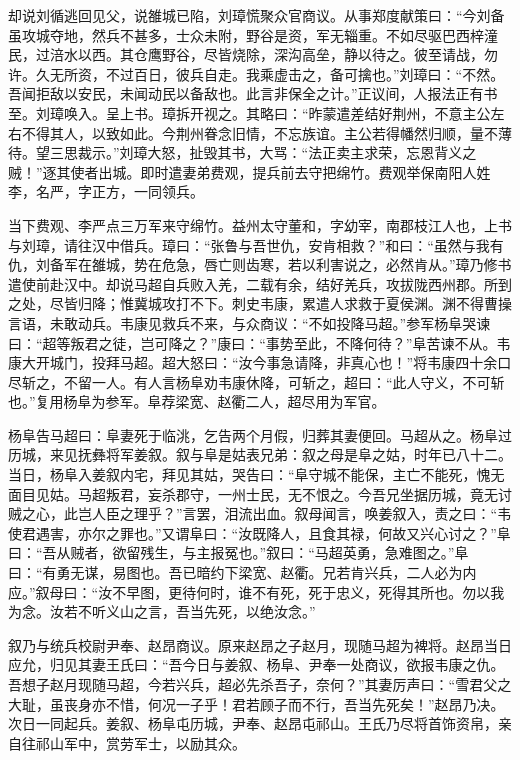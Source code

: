 却说刘循逃回见父，说雒城已陷，刘璋慌聚众官商议。从事郑度献策曰：“今刘备虽攻城夺地，然兵不甚多，士众未附，野谷是资，军无辎重。不如尽驱巴西梓潼民，过涪水以西。其仓鹰野谷，尽皆烧除，深沟高垒，静以待之。彼至请战，勿许。久无所资，不过百日，彼兵自走。我乘虚击之，备可擒也。”刘璋曰：“不然。吾闻拒敌以安民，未闻动民以备敌也。此言非保全之计。”正议间，人报法正有书至。刘璋唤入。呈上书。璋拆开视之。其略曰：“昨蒙遣差结好荆州，不意主公左右不得其人，以致如此。今荆州眷念旧情，不忘族谊。主公若得幡然归顺，量不薄待。望三思裁示。”刘璋大怒，扯毁其书，大骂：“法正卖主求荣，忘恩背义之贼！”逐其使者出城。即时遣妻弟费观，提兵前去守把绵竹。费观举保南阳人姓李，名严，字正方，一同领兵。

当下费观、李严点三万军来守绵竹。益州太守董和，字幼宰，南郡枝江人也，上书与刘璋，请往汉中借兵。璋曰：“张鲁与吾世仇，安肯相救？”和曰：“虽然与我有仇，刘备军在雒城，势在危急，唇亡则齿寒，若以利害说之，必然肯从。”璋乃修书遣使前赴汉中。却说马超自兵败入羌，二载有余，结好羌兵，攻拔陇西州郡。所到之处，尽皆归降；惟冀城攻打不下。刺史韦康，累遣人求救于夏侯渊。渊不得曹操言语，未敢动兵。韦康见救兵不来，与众商议：“不如投降马超。”参军杨阜哭谏曰：“超等叛君之徒，岂可降之？”康曰：“事势至此，不降何待？”阜苦谏不从。韦康大开城门，投拜马超。超大怒曰：“汝今事急请降，非真心也！”将韦康四十余口尽斩之，不留一人。有人言杨阜劝韦康休降，可斩之，超曰：“此人守义，不可斩也。”复用杨阜为参军。阜荐梁宽、赵衢二人，超尽用为军官。

杨阜告马超曰：阜妻死于临洮，乞告两个月假，归葬其妻便回。马超从之。杨阜过历城，来见抚彝将军姜叙。叙与阜是姑表兄弟：叙之母是阜之姑，时年已八十二。当日，杨阜入姜叙内宅，拜见其姑，哭告曰：“阜守城不能保，主亡不能死，愧无面目见姑。马超叛君，妄杀郡守，一州士民，无不恨之。今吾兄坐据历城，竟无讨贼之心，此岂人臣之理乎？”言罢，泪流出血。叙母闻言，唤姜叙入，责之曰：“韦使君遇害，亦尔之罪也。”又谓阜曰：“汝既降人，且食其禄，何故又兴心讨之？”阜曰：“吾从贼者，欲留残生，与主报冤也。”叙曰：“马超英勇，急难图之。”阜曰：“有勇无谋，易图也。吾已暗约下梁宽、赵衢。兄若肯兴兵，二人必为内应。”叙母曰：“汝不早图，更待何时，谁不有死，死于忠义，死得其所也。勿以我为念。汝若不听义山之言，吾当先死，以绝汝念。”

叙乃与统兵校尉尹奉、赵昂商议。原来赵昂之子赵月，现随马超为裨将。赵昂当日应允，归见其妻王氏曰：“吾今日与姜叙、杨阜、尹奉一处商议，欲报韦康之仇。吾想子赵月现随马超，今若兴兵，超必先杀吾子，奈何？”其妻厉声曰：“雪君父之大耻，虽丧身亦不惜，何况一子乎！君若顾子而不行，吾当先死矣！”赵昂乃决。次日一同起兵。姜叙、杨阜屯历城，尹奉、赵昂屯祁山。王氏乃尽将首饰资帛，亲自往祁山军中，赏劳军士，以励其众。

